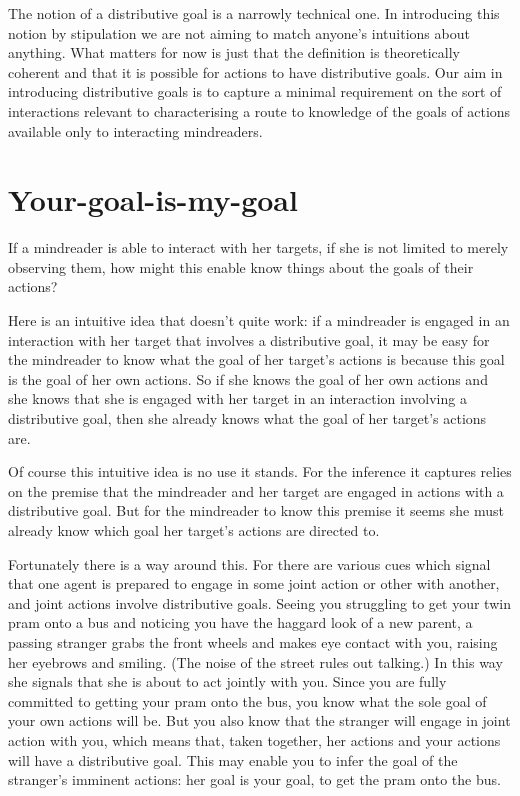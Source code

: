 \documentclass[12pt,\papersize]{extarticle}
\begin{document}
The notion of a distributive goal is a 
narrowly technical one.
In introducing this notion by stipulation we are not aiming to match anyone's intuitions about anything.
What matters for now is just that the definition is theoretically coherent and that it is possible for actions to have distributive goals.
Our aim in introducing distributive goals 
 is to capture a minimal requirement on the sort of interactions 
relevant to characterising a route to knowledge of the goals of actions
available only to interacting mindreaders.
% 


\section{Your-goal-is-my-goal}
\label{sec:your_goal_is_my_goal}
If a mindreader is able to interact with her targets,
if she is not limited to merely observing them,
how might this enable know things about the goals of their actions?

Here is an intuitive idea that doesn't quite work:
if a mindreader is engaged in an interaction with her target that involves a distributive goal, 
it may be easy for the mindreader to know what the goal of her target's actions is because this goal is the goal of her own actions.
So if she knows the goal of her own actions and she knows that she is engaged with her target in an interaction involving a distributive goal,
then she already knows what the goal of her target's actions are.

Of course this intuitive idea is no use it stands.  
For the inference it captures relies on the premise that the mindreader and her target are engaged in actions with a distributive goal.
But for the mindreader to know this premise it seems she must   already know which goal her target's actions are directed to.

Fortunately there is a way around this.  
For there are various cues which signal that one agent is prepared to engage in some joint action or other with another,
and joint actions involve distributive goals.  
\label{twin_pram}
Seeing you struggling to get your twin pram onto a bus and noticing you have the haggard look of a new parent, a passing stranger  grabs the front wheels and makes eye contact with you, raising her eyebrows and smiling.
(The noise of the street rules out talking.)   
In this way she signals that she is about to act jointly with you.   
Since you are fully committed to getting your pram onto the bus,
you know what the sole goal of your own actions will be.
But you also know that the stranger will engage in joint action with you,
which means that, taken together, her actions and your actions will have a distributive goal.
This may enable you to infer the goal of the stranger's imminent actions: 
her goal is your goal, to get the pram onto the bus.
\end{document}
